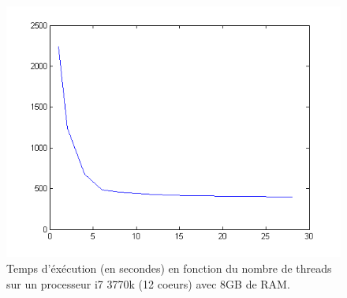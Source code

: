 \documentclass{article}
\begin{document}
\begin{figure}[ht]
	\centering
	\includegraphics[scale=0.8]{img/time.png}
	\caption{Temps d'éxécution (en secondes) en fonction du nombre de threads sur un processeur i7 3770k (12 coeurs)
	avec 8GB de RAM.}
	\label{fig:time}
\end{figure}
\end{document}
